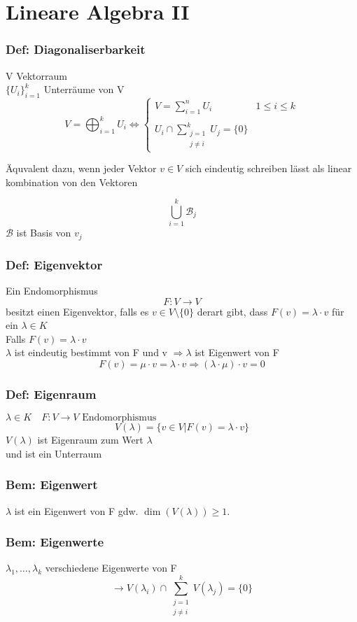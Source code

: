 \documentclass[titlepage,12pt,a4paper,ngerman]{report}
\begin{document}
\chapter{Lineare Algebra II}
\subsection{Def: Diagonaliserbarkeit}
V Vektorraum\\
$\{U_i\}_{i=1}^k$ Unterräume von V
$$ V = \bigoplus_{i=1}^{k} U_{i} \Leftrightarrow \left\{ \begin{array}{ll}
V = \sum_{i=1}^n U_i & 1\le i \le k \\
& \\
U_i \cap \sum\limits_{\substack{j=1\\ j\neq i}}^k U_j = \{0\} & 
\end{array} \right.$$

Äquvalent dazu, wenn jeder Vektor $v\in V$ sich eindeutig schreiben  lässt als linear kombination von den Vektoren 

$$\bigcup_{i=1}^k \mathcal{B}_j$$
$\mathcal{B}$ ist Basis von $v_j$

\subsection{Def: Eigenvektor} Ein Endomorphismus 
$$F: V\to V$$ besitzt einen Eigenvektor, falls es $v\in V\setminus\{0\}$ derart gibt, dass $F(v)= \lambda \cdot v $ für ein $ \lambda\in K$\\
Falls $F(v) = \lambda \cdot v$ \\
$\lambda$ ist eindeutig bestimmt von F und v $\Rightarrow \lambda$ ist Eigenwert von F
$$F(v) = \mu \cdot v = \lambda \cdot v \Rightarrow (\lambda\cdot \mu) \cdot v = 0$$
\subsection{Def: Eigenraum} $\lambda \in K\quad F: V\to V \textrm{ Endomorphismus}$
$$V(\lambda) = \{ v\in V\vert F(v) = \lambda \cdot v\}$$
$V(\lambda)$ ist Eigenraum zum Wert $\lambda$\\
und ist ein Unterraum
\subsection{Bem: Eigenwert}$\lambda$ ist ein Eigenwert von F gdw. $\dim(V(\lambda)) \ge 1$.
\subsection{Bem: Eigenwerte} $\lambda_1,\dots , \lambda_k$ verschiedene Eigenwerte von F 
$$\rightarrow V(\lambda_{i}) \cap  \sum_{\substack{j = 1\\j\neq i}}^k V(\lambda_j) = \{0\}$$
\end{document}
